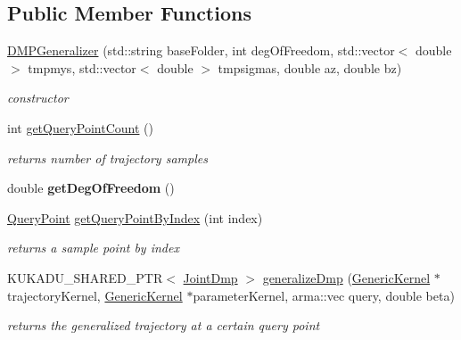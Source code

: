 \subsection*{Public Member Functions}
\begin{DoxyCompactItemize}
\item 
\hyperlink{classkukadu_1_1DMPGeneralizer_a75bfc264da4632ef2ce2454759b53d9c}{D\+M\+P\+Generalizer} (std\+::string base\+Folder, int deg\+Of\+Freedom, std\+::vector$<$ double $>$ tmpmys, std\+::vector$<$ double $>$ tmpsigmas, double az, double bz)
\begin{DoxyCompactList}\small\item\em constructor \end{DoxyCompactList}\item 
int \hyperlink{classkukadu_1_1DMPGeneralizer_a66ae70315e509c84bb1763825a15b2ea}{get\+Query\+Point\+Count} ()\hypertarget{classkukadu_1_1DMPGeneralizer_a66ae70315e509c84bb1763825a15b2ea}{}\label{classkukadu_1_1DMPGeneralizer_a66ae70315e509c84bb1763825a15b2ea}

\begin{DoxyCompactList}\small\item\em returns number of trajectory samples \end{DoxyCompactList}\item 
double {\bfseries get\+Deg\+Of\+Freedom} ()\hypertarget{classkukadu_1_1DMPGeneralizer_a603d560be6c932e1715d74bc581900fa}{}\label{classkukadu_1_1DMPGeneralizer_a603d560be6c932e1715d74bc581900fa}

\item 
\hyperlink{classkukadu_1_1QueryPoint}{Query\+Point} \hyperlink{classkukadu_1_1DMPGeneralizer_a670a0b673aee54cc4c10f308b1d211a2}{get\+Query\+Point\+By\+Index} (int index)
\begin{DoxyCompactList}\small\item\em returns a sample point by index \end{DoxyCompactList}\item 
K\+U\+K\+A\+D\+U\+\_\+\+S\+H\+A\+R\+E\+D\+\_\+\+P\+TR$<$ \hyperlink{classkukadu_1_1JointDmp}{Joint\+Dmp} $>$ \hyperlink{classkukadu_1_1DMPGeneralizer_acb8a703ee5bb8492d2035120ab51942b}{generalize\+Dmp} (\hyperlink{classkukadu_1_1GenericKernel}{Generic\+Kernel} $\ast$trajectory\+Kernel, \hyperlink{classkukadu_1_1GenericKernel}{Generic\+Kernel} $\ast$parameter\+Kernel, arma\+::vec query, double beta)
\begin{DoxyCompactList}\small\item\em returns the generalized trajectory at a certain query point \end{DoxyCompactList}\end{DoxyCompactItemize}


